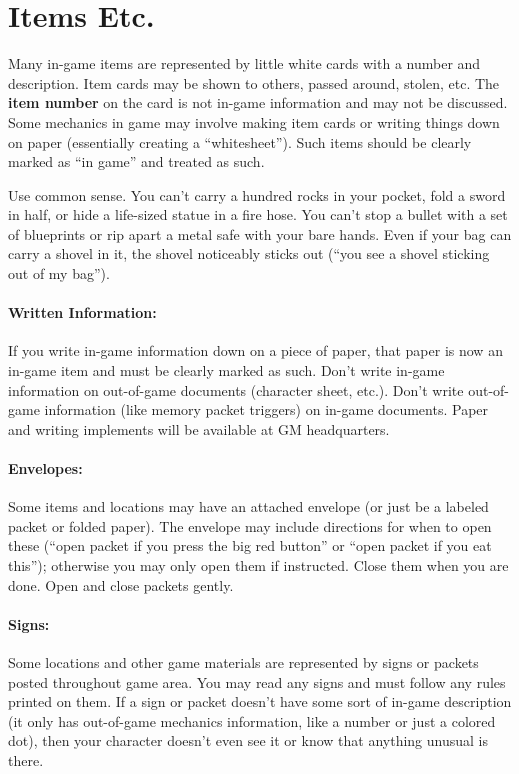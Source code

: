 \documentclass[sheet]{GL2020}
\begin{document}
\section{Items Etc.}

Many in-game items are represented by little white cards with a number and description.  Item cards may be shown to others, passed around, stolen, etc.  The {\bf item number} on the card is not in-game information and may not be discussed. Some mechanics in game may involve making item cards or writing things down on paper (essentially creating a ``whitesheet''). Such items should be clearly marked as ``in game'' and treated as such.

Use common sense. You can't carry a hundred rocks in your pocket, fold a sword in half, or hide a life-sized statue in a fire hose. You can't stop a bullet with a set of blueprints or rip apart a metal safe with your bare hands.  Even if your bag can carry a shovel in it, the shovel noticeably sticks out (``you see a shovel sticking out of my bag'').

\paragraph{Written Information:} If you write in-game information down on a piece of paper, that paper is now an in-game item and must be clearly marked as such. Don't write in-game information on out-of-game documents (character sheet, etc.). Don't write out-of-game information (like memory packet triggers) on in-game documents. Paper and writing implements will be available at GM headquarters.

\paragraph{Envelopes:} Some items and locations may have an attached envelope (or just be a labeled packet or folded paper). The envelope may include directions for when to open these (``open packet if you press the big red button'' or ``open packet if you eat this''); otherwise you may only open them if instructed.  Close them when you are done.  Open and close packets gently.

\paragraph{Signs:} Some locations and other game materials are represented by signs or packets posted throughout game area. You may read any signs and must follow any rules printed on them. If a sign or packet doesn't have some sort of in-game description (it only has out-of-game mechanics information, like a number or just a colored dot), then your character doesn't even see it or know that anything unusual is there.
\end{document}
